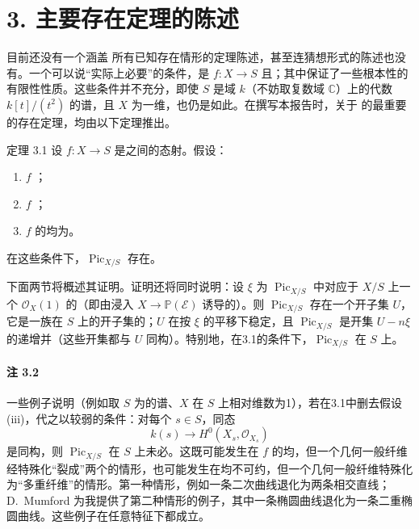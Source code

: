 \section*{3. 主要存在定理的陈述}
目前还没有一个涵盖 所有已知存在情形的定理陈述，甚至连猜想形式的陈述也没有。一个可以说“实际上必要”的条件，是 $f:X\to S$ 且；其中保证了一些根本性的有限性性质。这些条件并不充分，即使 $S$ 是域 $k$（不妨取复数域 $\mathbb C$）上的代数 $k[t]/(t^2)$ 的谱，且 $X$ 为一维，也仍是如此。在撰写本报告时，关于 的最重要的存在定理，均由以下定理推出。
\begin{statement}{定理 3.1}
设 $f:X\to S$ 是之间的态射。假设：
\begin{enumerate}
\item[(i)] $f$ ；
\item[(ii)] $f$ ；
\item[(iii)] $f$ 的均为。
\end{enumerate}
在这些条件下，$\operatorname{Pic}_{X/S}$ 存在。
\end{statement}
下面两节将概述其证明。证明还将同时说明：设 $\xi$ 为 $\operatorname{Pic}_{X/S}$ 中对应于 $X/S$ 上一个 $\mathcal O_X(1)$ 的（即由浸入 $X\to\mathbb P(\mathcal E)$ 诱导的）。则 $\operatorname{Pic}_{X/S}$ 存在一个开子集 $U$，它是一族在 $S$ 上的开子集的；$U$ 在按 $\xi$ 的平移下稳定，且 $\operatorname{Pic}_{X/S}$ 是开集 $U-n\xi$ 的递增并（这些开集都与 $U$ 同构）。特别地，在3.1的条件下，$\operatorname{Pic}_{X/S}$ 在 $S$ 上。

\paragraph{注 3.2}
一些例子说明（例如取 $S$ 为的谱、$X$ 在 $S$ 上相对维数为1），若在3.1中删去假设(iii)，代之以较弱的条件：对每个 $s\in S$，同态
\[k(s)\longrightarrow H^0(X_s,\mathcal O_{X_s})\]
是同构，则 $\operatorname{Pic}_{X/S}$ 在 $S$ 上未必。这既可能发生在 $f$ 的均，但一个几何一般纤维经特殊化“裂成”两个的情形，也可能发生在均不可约，但一个几何一般纤维特殊化为“多重纤维”的情形。第一种情形，例如一条二次曲线退化为两条相交直线；D.~Mumford 为我提供了第二种情形的例子，其中一条椭圆曲线退化为一条二重椭圆曲线。这些例子在任意特征下都成立。

